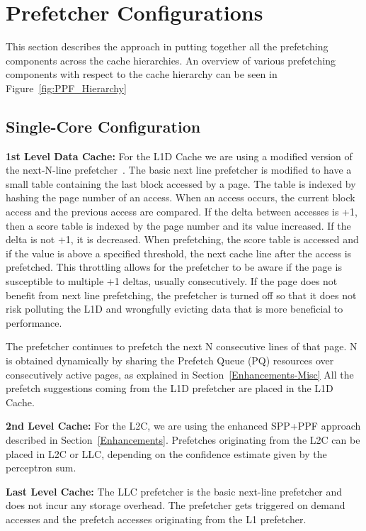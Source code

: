 \section{Prefetcher Configurations}
\label{Config}

This section describes the approach in putting together all the
prefetching components across the cache hierarchies. An overview
of various prefetching components with respect to the cache hierarchy
can be seen in Figure~\ref{fig:PPF_Hierarchy}

\subsection{Single-Core Configuration}
\label{Config-Single}

\noindent \textbf{1st Level Data Cache:} For the L1D Cache we are
using a modified version of the next-N-line prefetcher~\cite{nextn}.
The basic next line prefetcher is modified to have a small table
containing the last block accessed by a page. The table is indexed by
hashing the page number of an access.  When an access occurs, the
current block access and the previous access are compared.  If the
delta between accesses is +1, then a score table is indexed by the
page number and its value increased. If the delta is not +1, it is
decreased. When prefetching, the score table is accessed and if the
value is above a specified threshold, the next cache line after the
access is prefetched. This throttling allows for the prefetcher to be
aware if the page is susceptible to multiple +1 deltas, usually
consecutively. If the page does not benefit from next line
prefetching, the prefetcher is turned off so that it does not risk
polluting the L1D and wrongfully evicting data that is more beneficial
to performance.

The prefetcher continues to prefetch the next N consecutive lines of
that page. N is obtained dynamically by sharing the Prefetch Queue
(PQ) resources over consecutively active pages, as explained in
Section~\ref{Enhancements-Misc}
All the prefetch suggestions coming from the L1D prefetcher are placed
in the L1D Cache.

\noindent \textbf{2nd Level Cache:} For the L2C, we are using the
enhanced SPP+PPF approach described in Section~\ref{Enhancements}. 
Prefetches originating from the L2C can be placed in L2C or LLC, 
depending on the confidence estimate given by the perceptron sum.

\noindent \textbf{Last Level Cache:} The LLC prefetcher is the basic
next-line prefetcher and does not incur any storage overhead. 
The prefetcher gets triggered on demand accesses and the prefetch accesses 
originating from the L1 prefetcher. 


